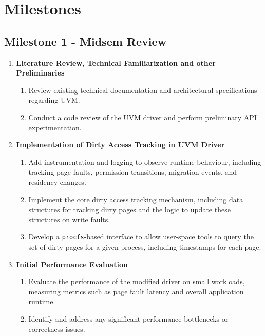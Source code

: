 \section*{Milestones}

\subsection*{Milestone 1 - Midsem Review}

    \begin{enumerate}
        \item \textbf{Literature Review, Technical Familiarization and other Preliminaries}
        \begin{enumerate}
            \item Review existing technical documentation and architectural specifications regarding UVM.
            \item Conduct a code review of the UVM driver and perform preliminary API experimentation.
        \end{enumerate}

        \item \textbf{Implementation of Dirty Access Tracking in UVM Driver}
        \begin{enumerate}
            \item Add instrumentation and logging to observe runtime behaviour, including tracking page faults,
                  permission transitions, migration events, and residency changes.
            \item Implement the core dirty access tracking mechanism, including data structures for tracking
                  dirty pages and the logic to update these structures on write faults.
            \item Develop a \texttt{procfs}-based interface to allow user-space tools to query the set of
                  dirty pages for a given process, including timestamps for each page.
        \end{enumerate}

        \item \textbf{Initial Performance Evaluation}
        \begin{enumerate}
            \item Evaluate the performance of the modified driver on small workloads, measuring metrics such
                  as page fault latency and overall application runtime.
            \item Identify and address any significant performance bottlenecks or correctness issues.
        \end{enumerate}
    \end{enumerate}

